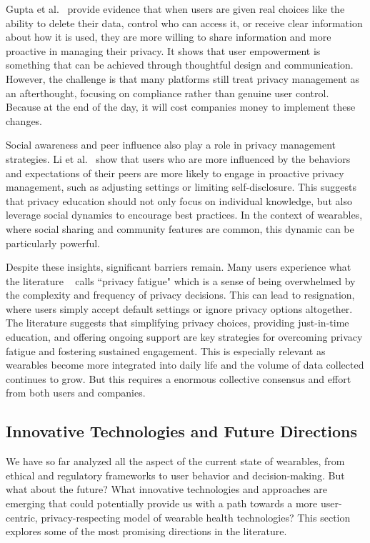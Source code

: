 	Gupta et al.~\cite{Gupta2023} provide evidence that when users are given real choices like the ability to delete their data, control who can access it, or receive clear information about how it is used, they are more willing to share information and more proactive in managing their privacy. It shows that user empowerment is something that can be achieved through thoughtful design and communication. However, the challenge is that many platforms still treat privacy management as an afterthought, focusing on compliance rather than genuine user control. Because at the end of the day, it will cost companies money to implement these changes.

	Social awareness and peer influence also play a role in privacy management strategies. Li et al.~\cite{Li2019} show that users who are more influenced by the behaviors and expectations of their peers are more likely to engage in proactive privacy management, such as adjusting settings or limiting self-disclosure. This suggests that privacy education should not only focus on individual knowledge, but also leverage social dynamics to encourage best practices. In the context of wearables, where social sharing and community features are common, this dynamic can be particularly powerful.

	Despite these insights, significant barriers remain. Many users experience what the literature ~\cite{Choi2018} calls “privacy fatigue" which is a sense of being overwhelmed by the complexity and frequency of privacy decisions. This can lead to resignation, where users simply accept default settings or ignore privacy options altogether. The literature suggests that simplifying privacy choices, providing just-in-time education, and offering ongoing support are key strategies for overcoming privacy fatigue and fostering sustained engagement. This is especially relevant as wearables become more integrated into daily life and the volume of data collected continues to grow. But this requires a enormous collective consensus and effort from both users and companies.
\subsection{Innovative Technologies and Future Directions}
We have so far analyzed all the aspect of the current state of wearables, from ethical and regulatory frameworks to user behavior and decision-making. But what about the future? What innovative technologies and approaches are emerging that could potentially provide us with a path towards a more user-centric, privacy-respecting model of wearable health technologies? This section explores some of the most promising directions in the literature.

